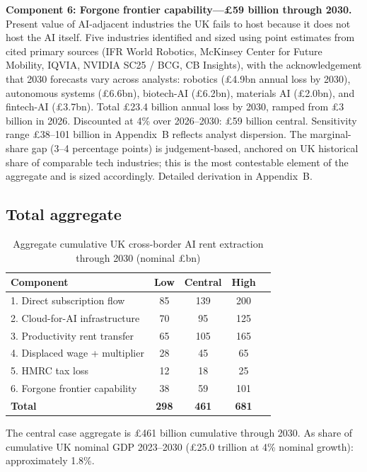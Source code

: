\documentclass[11pt,letterpaper]{article}
\theoremstyle{remark}
\begin{document}
\textbf{Component 6: Forgone frontier capability---\pounds59 billion through 2030.} Present value of {AI}-adjacent industries the {UK} fails to host because it does not host the {AI} itself. Five industries identified and sized using point estimates from cited primary sources (IFR World Robotics, McKinsey Center for Future Mobility, IQVIA, NVIDIA SC25 / BCG, CB Insights), with the acknowledgement that 2030 forecasts vary across analysts: robotics (\pounds4.9bn annual loss by 2030), autonomous systems (\pounds6.6bn), biotech-{AI} (\pounds6.2bn), materials {AI} (\pounds2.0bn), and fintech-{AI} (\pounds3.7bn). Total \pounds23.4 billion annual loss by 2030, ramped from \pounds3 billion in 2026. Discounted at 4\% over 2026--2030: \pounds59 billion central. Sensitivity range \pounds38--101 billion in Appendix~B reflects analyst dispersion. The marginal-share gap (3--4 percentage points) is judgement-based, anchored on UK historical share of comparable tech industries; this is the most contestable element of the aggregate and is sized accordingly. Detailed derivation in Appendix~B.

\subsection{Total aggregate}

\begin{table}[h]
\centering
\caption{Aggregate cumulative {UK} cross-border {AI} rent extraction through 2030 (nominal \pounds bn)}
\begin{tabular}{lcccc}
\toprule
Component & Low & Central & High \\
\midrule
1. Direct subscription flow & 85 & 139 & 200 \\
2. Cloud-for-{AI} infrastructure & 70 & 95 & 125 \\
3. Productivity rent transfer & 65 & 105 & 165 \\
4. Displaced wage + multiplier & 28 & 45 & 65 \\
5. HMRC tax loss & 12 & 18 & 25 \\
6. Forgone frontier capability & 38 & 59 & 101 \\
\midrule
\textbf{Total} & \textbf{298} & \textbf{461} & \textbf{681} \\
\bottomrule
\end{tabular}
\end{table}

The central case aggregate is \pounds461 billion cumulative through 2030. As share of cumulative {UK} nominal {GDP} 2023--2030 (\pounds25.0 trillion at 4\% nominal growth): approximately 1.8\%.
\end{document}
